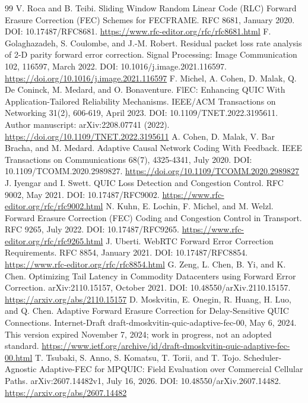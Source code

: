 \documentclass[11pt,a4paper]{article}
\begin{document}
\begin{thebibliography}{99}\footnotesize\setlength{\itemsep}{2pt}\setlength{\parskip}{0pt}
 V. Roca and B. Teibi. Sliding Window Random Linear Code (RLC) Forward Erasure Correction (FEC) Schemes for FECFRAME. RFC 8681, January 2020. DOI: 10.17487/RFC8681. \url{https://www.rfc-editor.org/rfc/rfc8681.html}
 F. Golaghazadeh, S. Coulombe, and J.-M. Robert. Residual packet loss rate analysis of 2-D parity forward error correction. Signal Processing: Image Communication 102, 116597, March 2022. DOI: 10.1016/j.image.2021.116597. \url{https://doi.org/10.1016/j.image.2021.116597}
 F. Michel, A. Cohen, D. Malak, Q. De Coninck, M. Medard, and O. Bonaventure. FlEC: Enhancing QUIC With Application-Tailored Reliability Mechanisms. IEEE/ACM Transactions on Networking 31(2), 606-619, April 2023. DOI: 10.1109/TNET.2022.3195611. Author manuscript: arXiv:2208.07741 (2022). \url{https://doi.org/10.1109/TNET.2022.3195611}
 A. Cohen, D. Malak, V. Bar Bracha, and M. Medard. Adaptive Causal Network Coding With Feedback. IEEE Transactions on Communications 68(7), 4325-4341, July 2020. DOI: 10.1109/TCOMM.2020.2989827. \url{https://doi.org/10.1109/TCOMM.2020.2989827}
 J. Iyengar and I. Swett. QUIC Loss Detection and Congestion Control. RFC 9002, May 2021. DOI: 10.17487/RFC9002. \url{https://www.rfc-editor.org/rfc/rfc9002.html}
 N. Kuhn, E. Lochin, F. Michel, and M. Welzl. Forward Erasure Correction (FEC) Coding and Congestion Control in Transport. RFC 9265, July 2022. DOI: 10.17487/RFC9265. \url{https://www.rfc-editor.org/rfc/rfc9265.html}
 J. Uberti. WebRTC Forward Error Correction Requirements. RFC 8854, January 2021. DOI: 10.17487/RFC8854. \url{https://www.rfc-editor.org/rfc/rfc8854.html}
 G. Zeng, L. Chen, B. Yi, and K. Chen. Optimizing Tail Latency in Commodity Datacenters using Forward Error Correction. arXiv:2110.15157, October 2021. DOI: 10.48550/arXiv.2110.15157. \url{https://arxiv.org/abs/2110.15157}
 D. Moskvitin, E. Onegin, R. Huang, H. Luo, and Q. Chen. Adaptive Forward Erasure Correction for Delay-Sensitive QUIC Connections. Internet-Draft draft-dmoskvitin-quic-adaptive-fec-00, May 6, 2024. This version expired November 7, 2024; work in progress, not an adopted standard. \url{https://www.ietf.org/archive/id/draft-dmoskvitin-quic-adaptive-fec-00.html}
 T. Tsubaki, S. Anno, S. Komatsu, T. Torii, and T. Tojo. Scheduler-Agnostic Adaptive-FEC for MPQUIC: Field Evaluation over Commercial Cellular Paths. arXiv:2607.14482v1, July 16, 2026. DOI: 10.48550/arXiv.2607.14482. \url{https://arxiv.org/abs/2607.14482}

\end{thebibliography}
\end{document}
